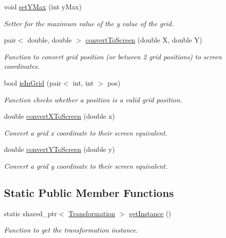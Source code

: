 \begin{DoxyCompactItemize}
void \hyperlink{classGameLogic_1_1Transformation_a0da7509d874b735240aba51c72f31811}{set\+Y\+Max} (int y\+Max)
\begin{DoxyCompactList}\small\item\em Setter for the maximum value of the y value of the grid. \end{DoxyCompactList}\item 
pair$<$ double, double $>$ \hyperlink{classGameLogic_1_1Transformation_a30bed07a78fb248b129e50234ecef28a}{convert\+To\+Screen} (double X, double Y)
\begin{DoxyCompactList}\small\item\em Function to convert grid position (or between 2 grid positions) to screen coordinates. \end{DoxyCompactList}\item 
bool \hyperlink{classGameLogic_1_1Transformation_a573549aa64a0932387e9ab116e408493}{is\+In\+Grid} (pair$<$ int, int $>$ pos)
\begin{DoxyCompactList}\small\item\em Function checks whether a position is a valid grid position. \end{DoxyCompactList}\item 
double \hyperlink{classGameLogic_1_1Transformation_a1168354a2f68dcfcee917da9ec1076ac}{convert\+X\+To\+Screen} (double x)
\begin{DoxyCompactList}\small\item\em Convert a grid x coordinate to their screen equivalent. \end{DoxyCompactList}\item 
double \hyperlink{classGameLogic_1_1Transformation_a6a3d8fd76997ed12fc6dc9640118f405}{convert\+Y\+To\+Screen} (double y)
\begin{DoxyCompactList}\small\item\em Convert a grid y coordinate to their screen equivalent. \end{DoxyCompactList}\end{DoxyCompactItemize}
\subsection*{Static Public Member Functions}
\begin{DoxyCompactItemize}
\item 
static shared\+\_\+ptr$<$ \hyperlink{classGameLogic_1_1Transformation}{Transformation} $>$ \hyperlink{classGameLogic_1_1Transformation_a1b76a508913396581f4eeed63e96776d}{get\+Instance} ()
\begin{DoxyCompactList}\small\item\em Function to get the transformation instance. \end{DoxyCompactList}\end{DoxyCompactItemize}


